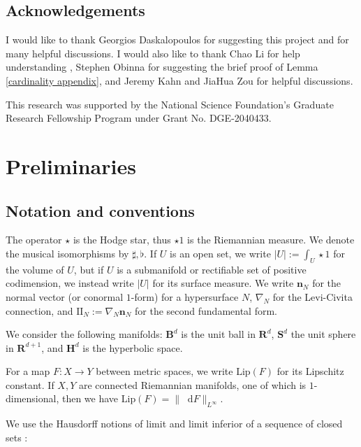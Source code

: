 \documentclass[reqno,11pt]{amsart}
\newcommand{\RR}{\mathbf{R}}
\newcommand{\Hyp}{\mathbf H}
\newcommand{\Sph}{\mathbf S}
\newcommand{\Ball}{\mathbf{B}}
\newcommand*\dif{\mathop{}\!\mathrm{d}}
\newcommand{\Two}{\mathrm{I\!I}}
\newcommand{\normal}{\mathbf n}
\newcommand{\Lip}{\mathrm{Lip}}
\theoremstyle{definition}
\numberwithin{equation}{section}
\begin{document}


\subsection{Acknowledgements}
I would like to thank Georgios Daskalopoulos for suggesting this project and for many helpful discussions.
I would also like to thank Chao Li for help understanding \cite{Chodosh2021}, Stephen Obinna for suggesting the brief proof of Lemma \ref{cardinality appendix}, and Jeremy Kahn and JiaHua Zou for helpful discussions.

This research was supported by the National Science Foundation's Graduate Research Fellowship Program under Grant No. DGE-2040433.




\section{Preliminaries}\label{Prelims}
\subsection{Notation and conventions}
The operator $\star$ is the Hodge star, thus $\star 1$ is the Riemannian measure.
We denote the musical isomorphisms by $\sharp, \flat$.
If $U$ is an open set, we write $|U| := \int_U \star 1$ for the volume of $U$, but if $U$ is a submanifold or rectifiable set of positive codimension, we instead write $|U|$ for its surface measure.
We write $\normal_N$ for the normal vector (or conormal $1$-form) for a hypersurface $N$, $\nabla_N$ for the Levi-Civita connection, and $\Two_N := \nabla_N \normal_N$ for the second fundamental form.

We consider the following manifolds: $\Ball^d$ is the unit ball in $\RR^d$, $\Sph^d$ the unit sphere in $\RR^{d + 1}$, and $\Hyp^d$ is the hyperbolic space.

For a map $F: X \to Y$ between metric spaces, we write $\Lip(F)$ for its Lipschitz constant.
If $X, Y$ are connected Riemannian manifolds, one of which is $1$-dimensional, then we have $\Lip(F) = \|\dif F\|_{L^\infty}$.

We use the Hausdorff notions of limit and limit inferior of a sequence of closed sets \cite[Chapter IV]{nadler2017continuum}:
\end{document}
